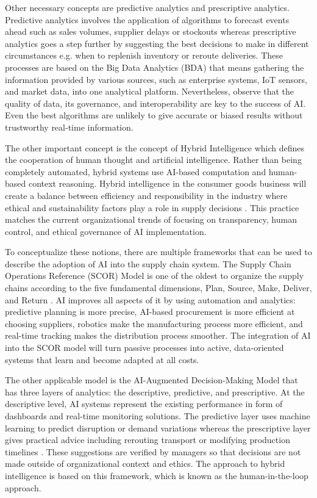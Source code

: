 Other necessary concepts are predictive analytics and prescriptive analytics. Predictive analytics involves the application of algorithms to forecast events ahead such as sales volumes, supplier delays or stockouts whereas prescriptive analytics goes a step further by suggesting the best decisions to make in different circumstances e.g. when to replenish inventory or reroute deliveries. These processes are based on the Big Data Analytics (BDA) that means gathering the information provided by various sources, such as enterprise systems, IoT sensors, and market data, into one analytical platform. Nevertheless, \autocite{kache2017challenges} observe that the quality of data, its governance, and interoperability are key to the success of AI. Even the best algorithms are unlikely to give accurate or biased results without trustworthy real-time information.

The other important concept is the concept of Hybrid Intelligence which defines the cooperation of human thought and artificial intelligence. Rather than being completely automated, hybrid systems use AI-based computation and human-based context reasoning. Hybrid intelligence in the consumer goods business will create a balance between efficiency and responsibility in the industry where ethical and sustainability factors play a role in supply decisions \autocite{vann2025human}. This practice matches the current organizational trends of focusing on transparency, human control, and ethical governance of AI implementation.

To conceptualize these notions, there are multiple frameworks that can be used to describe the adoption of AI into the supply chain system. The Supply Chain Operations Reference (SCOR) Model is one of the oldest to organize the supply chains according to the five fundamental dimensions, Plan, Source, Make, Deliver, and Return \autocite{derfoufiintegrating}. AI improves all aspects of it by using automation and analytics: predictive planning is more precise, AI-based procurement is more efficient at choosing suppliers, robotics make the manufacturing process more efficient, and real-time tracking makes the distribution process smoother. The integration of AI into the SCOR model will turn passive processes into active, data-oriented systems that learn and become adapted at all costs.

The other applicable model is the AI-Augmented Decision-Making Model that has three layers of analytics: the descriptive, predictive, and prescriptive. At the descriptive level, AI systems represent the existing performance in form of dashboards and real-time monitoring solutions. The predictive layer uses machine learning to predict disruption or demand variations whereas the prescriptive layer gives practical advice including rerouting transport or modifying production timelines \autocite{herath2023}. These suggestions are verified by managers so that decisions are not made outside of organizational context and ethics. The approach to hybrid intelligence is based on this framework, which is known as the human-in-the-loop approach.

